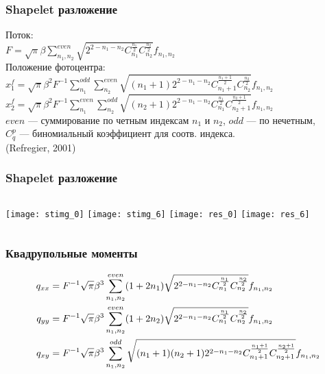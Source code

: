 \begin{frame}
\frametitle{Shapelet разложение}
{\footnotesize Поток:}\\
{\tiny $F = \sqrt{\pi} \beta \sum^{even}_{n_1,n_2} \sqrt{2^{2-n_1-n_2}C^{\frac{n_1}{2}}_{n_1}C^{\frac{n_2}{2}}_{n_2}}f_{n_1,n_2}$}\\[15pt]
{\footnotesize Положение фотоцентра:}\\
{\scriptsize $x_1^f = \sqrt{\pi} \beta^2 F^{-1} \sum^{odd}_{n_1}\sum^{even}_{n_2} \sqrt{(n_1+1)2^{2-n_1-n_2}C^{\frac{n_1+1}{2}}_{n_1+1}C^{\frac{n_2}{2}}_{n_2}}f_{n_1,n_2}$}\\[10pt]
{\scriptsize $x_2^f = \sqrt{\pi} \beta^2 F^{-1} \sum^{even}_{n_1}\sum^{odd}_{n_2} \sqrt{(n_2+1)2^{2-n_1-n_2}C^{\frac{n_1}{2}}_{n_1}C^{\frac{n_2+1}{2}}_{n_2+1}}f_{n_1,n_2}$}\\[15pt]
{\tiny $even$ --- суммирование по четным индексам $n_1$ и $n_2$, $odd$ --- по нечетным,\\ $C^p_q$ --- биномиальный коэффициент для соотв. индекса.}\\[15pt]
{\footnotesize (Refregier, 2001)}
\end{frame}


\begin{frame}
\frametitle{Shapelet разложение}
\begin{center}
\begin{columns}
	\texttt{[image: stimg\_0]}
	\texttt{[image: stimg\_6]}
	\texttt{[image: res\_0]}
	\texttt{[image: res\_6]}
\end{columns}
\end{center}
\end{frame}


\begin{frame}%
\frametitle{Квадрупольные моменты}
{\small
\begin{align*}
  q_{xx} & = F^{-1} \sqrt{\pi} \beta^3 \sum^{even}_{n_1,n_2} (1+2n_1) \sqrt{2^{2-n_1-n_2}C^{\frac{n_1}{2}}_{n_1}C^{\frac{n_2}{2}}_{n_2}}f_{n_1,n_2} \\
  \vspace{5mm}
  q_{yy} & = F^{-1} \sqrt{\pi} \beta^3 \sum^{even}_{n_1,n_2} (1+2n_2) \sqrt{2^{2-n_1-n_2}C^{\frac{n_1}{2}}_{n_1}C^{\frac{n_2}{2}}_{n_2}}f_{n_1,n_2} \\
  \vspace{5mm}
  q_{xy} & = F^{-1} \sqrt{\pi} \beta^3 \sum^{odd}_{n_1,n_2} \sqrt{(n_1+1)(n_2+1)2^{2-n_1-n_2}C^{\frac{n_1+1}{2}}_{n_1+1}C^{\frac{n_2+1}{2}}_{n_2+1}}f_{n_1,n_2} 
\end{align*}
}
\end{frame}


